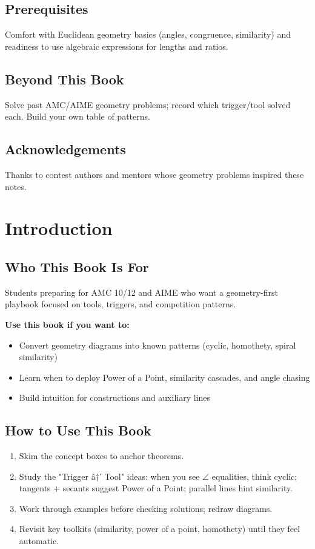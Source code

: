 ﻿\documentclass[12pt]{extarticle}
\begin{document}
\subsection*{Prerequisites}
Comfort with Euclidean geometry basics (angles, congruence, similarity) and readiness to use algebraic expressions for lengths and ratios.

\subsection*{Beyond This Book}
Solve past AMC/AIME geometry problems; record which trigger/tool solved each. Build your own table of patterns.

\subsection*{Acknowledgements}
Thanks to contest authors and mentors whose geometry problems inspired these notes.

\newpage

\section{Introduction}

\subsection*{Who This Book Is For}
Students preparing for AMC 10/12 and AIME who want a geometry-first playbook focused on tools, triggers, and competition patterns.

	\textbf{Use this book if you want to:}
\begin{itemize}
  \item Convert geometry diagrams into known patterns (cyclic, homothety, spiral similarity)
  \item Learn when to deploy Power of a Point, similarity cascades, and angle chasing
  \item Build intuition for constructions and auxiliary lines
\end{itemize}

\subsection*{How to Use This Book}
\begin{enumerate}
  \item Skim the concept boxes to anchor theorems.
  \item Study the "Trigger â†’ Tool" ideas: when you see $\angle$ equalities, think cyclic; tangents + secants suggest Power of a Point; parallel lines hint similarity.
  \item Work through examples before checking solutions; redraw diagrams.
  \item Revisit key toolkits (similarity, power of a point, homothety) until they feel automatic.
\end{enumerate}
\end{document}
